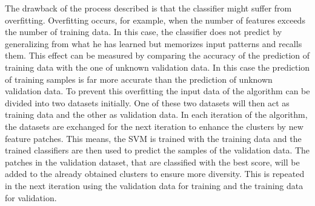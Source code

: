 The drawback of the process described is that the classifier might suffer from overfitting. Overfitting occurs, for example, when the number of features exceeds the number of training data. In this case, the classifier does not predict by generalizing from what he has learned but memorizes input patterns and recalls them. This effect can be measured by comparing the accuracy of the prediction of training data with the one of unknown validation data. In this case the prediction of training samples is far more accurate than the prediction of unknown validation data. To prevent this overfitting the input data of the algorithm can be divided into two datasets initially. One of these two datasets will then act as training data and the other as validation data. In each iteration of the algorithm, the datasets are exchanged for the next iteration to enhance the clusters by new feature patches. This means, the SVM is trained with the training data and the trained classifiers are then used to predict the samples of the validation data. The patches in the validation dataset, that are classified with the best score, will be added to the already obtained clusters to ensure more diversity. This is repeated in the next iteration using the validation data for training and the training data for validation.


